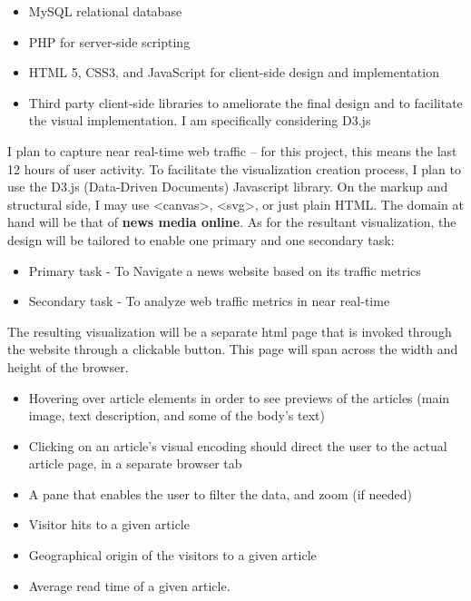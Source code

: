 \documentclass[12pt]{article}
\begin{document}
\begin{itemize}
\item MySQL relational database
\item PHP for server-side scripting
\item HTML 5, CSS3, and JavaScript for client-side design and implementation
\item Third party client-side libraries to ameliorate the final design and to facilitate the visual implementation. I am specifically considering D3.js
\end{itemize}

I plan to capture near real-time web traffic – for this project, this means the last 12 hours of user activity. To facilitate the visualization creation process, I plan to use the D3.js (Data-Driven Documents) Javascript library. On the markup and structural side, I may use <canvas>, <svg>, or just plain HTML. The domain at hand will be that of \textbf{news media online}. As for the resultant visualization, the design will be tailored to enable one primary and one secondary task:
\begin{itemize}
\item Primary task - To Navigate a news website based on its traffic metrics
\item Secondary task - To analyze web traffic metrics in near real-time
\end{itemize}

The resulting visualization will be a separate html page that is invoked through the website through a clickable button. This page will span across the width and height of the browser.

\begin{itemize}
\item Hovering over article elements in order to see previews of the articles (main image, text description, and some of the body’s text)
\item Clicking on an article’s visual encoding should direct the user to the actual article page, in a separate browser tab
\item A pane that enables the user to filter the data, and zoom (if needed)
\end{itemize}

\begin{itemize}
\item Visitor hits to a given article
\item Geographical origin of the visitors to a given article
\item Average read time of a given article.
\end{itemize}
\end{document}
